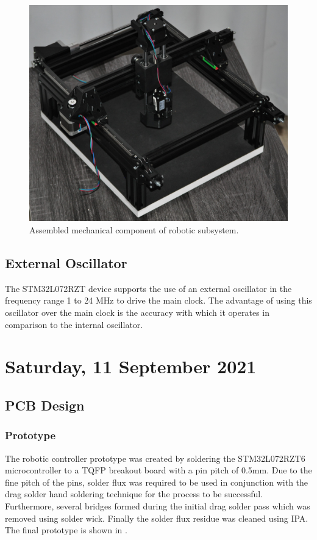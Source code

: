 \begin{figure}[H]
	\centering
	\includegraphics[width=0.7\linewidth]{figures/202109/final-robotic-system.JPG}
	\caption{Assembled mechanical component of robotic subsystem.}
	\label{fig:final-robotic-system}
\end{figure}

\subsection{External Oscillator}

The STM32L072RZT device supports the use of an external oscillator in the frequency range 1 to 24 MHz to drive the main clock. The advantage of using this oscillator over the main clock is the accuracy with which it operates in comparison to the internal oscillator.

\pendsign

\section[2021/09/11]{Saturday, 11 September 2021}

\subsection{PCB Design}

\subsubsection{Prototype}

The robotic controller prototype was created by soldering the STM32L072RZT6 microcontroller to a \ac{TQFP} breakout board with a pin pitch of 0.5mm. Due to the fine pitch of the pins, solder flux was required to be used in conjunction with the drag solder hand soldering technique for the process to be successful. Furthermore, several bridges formed during the initial drag solder pass which was removed using solder wick. Finally the solder flux residue was cleaned using \ac{IPA}. The final prototype is shown in .

